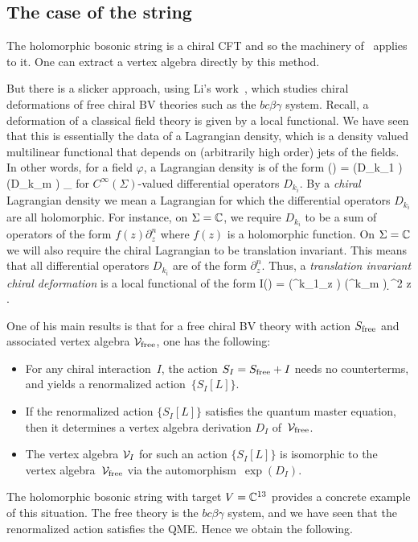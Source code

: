 \subsection{The case of the string}

The holomorphic bosonic string is a chiral CFT and so the machinery of~\cite{CG1} applies to it.
One can extract a vertex algebra directly by this method.

But there is a slicker approach, using Li's work~\cite{Li},
which studies chiral deformations of free chiral BV theories such as the $bc\beta\gamma$ system.
Recall, a deformation of a classical field theory is given by a local functional. 
We have seen that this is essentially the data of a Lagrangian density, which is a density valued multilinear functional that depends on (arbitrarily high order) jets of the fields. 
In other words, for a field $\varphi$, a Lagrangian density is of the form
\ben
\cL(\varphi) = \sum (D_{k_1} \varphi) \cdots (D_{k_m} \varphi) _\Sigma
\een 
for $C^\infty(\Sigma)$-valued differential operators $D_{k_i}$.
By a {\em chiral} Lagrangian density we mean a Lagrangian for which the differential operators $D_{k_i}$ are all holomorphic. 
For instance, on $\Sigma = \mathbb C$, we require $D_{k_i}$ to be a sum of operators of the form $f(z) \partial_z^n$ where $f(z)$ is a holomorphic function. 
On $\Sigma = \mathbb C$ we will also require the chiral Lagrangian to be translation invariant. 
This means that all differential operators $D_{k_i}$ are of the form $\partial_z^n$. 
Thus, a {\em translation invariant chiral deformation} is a local functional of the form
\ben
I(\varphi) = \sum \int (\partial^{k_1}_z \varphi) \cdots (\partial^{k_m} \varphi) \d^2 z .
\een

One of his main results is that for a free chiral BV theory with action $S_{\rm free}$ and associated vertex algebra $\mathcal{V}_{\rm free}$, one has the following:
\begin{itemize}
\item For any chiral interaction~$I$, the action $S_I = S_{\rm free} + I$ needs no counterterms, 
and yields a renormalized action~$\{S_I[L]\}$.
\item If the renormalized action $\{S_I[L]\}$ satisfies the quantum master equation,
then it determines a vertex algebra derivation $D_I$ of~$\mathcal{V}_{\rm free}$.
\item The vertex algebra $\mathcal{V}_I$ for such an action $\{S_I[L]\}$ is isomorphic to the vertex algebra~$\mathcal{V}_{\rm free}$ via the automorphism~$\exp(D_I)$.
\end{itemize}
The holomorphic bosonic string with target $V=\mathbb C^{13}$ provides a concrete example of this situation.
The free theory is the $bc\beta\gamma$ system, 
and we have seen that the renormalized action satisfies the QME.
Hence we obtain the following.


